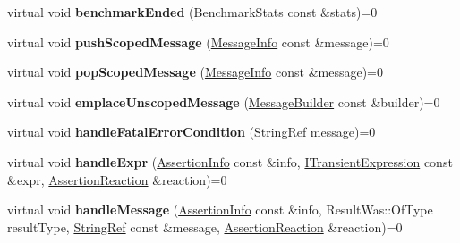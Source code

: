 \begin{DoxyCompactItemize}
virtual void {\bfseries benchmark\+Ended} (Benchmark\+Stats const \&stats)=0
\item 
\mbox{\label{structCatch_1_1IResultCapture_a91d154c1e087e383dcde5aad95cb6a05}} 
virtual void {\bfseries push\+Scoped\+Message} (\mbox{\hyperlink{structCatch_1_1MessageInfo}{Message\+Info}} const \&message)=0
\item 
\mbox{\label{structCatch_1_1IResultCapture_a42bcb13276706bf8c3ce081ce16d37fd}} 
virtual void {\bfseries pop\+Scoped\+Message} (\mbox{\hyperlink{structCatch_1_1MessageInfo}{Message\+Info}} const \&message)=0
\item 
\mbox{\label{structCatch_1_1IResultCapture_a49f74f1323ef8be71b8f9b8e8b2c0fc2}} 
virtual void {\bfseries emplace\+Unscoped\+Message} (\mbox{\hyperlink{structCatch_1_1MessageBuilder}{Message\+Builder}} const \&builder)=0
\item 
\mbox{\label{structCatch_1_1IResultCapture_a48559e6598ba9474b903697b69c769b2}} 
virtual void {\bfseries handle\+Fatal\+Error\+Condition} (\mbox{\hyperlink{classCatch_1_1StringRef}{String\+Ref}} message)=0
\item 
\mbox{\label{structCatch_1_1IResultCapture_a59a2b05391e464954575d2afb6d5d607}} 
virtual void {\bfseries handle\+Expr} (\mbox{\hyperlink{structCatch_1_1AssertionInfo}{Assertion\+Info}} const \&info, \mbox{\hyperlink{structCatch_1_1ITransientExpression}{I\+Transient\+Expression}} const \&expr, \mbox{\hyperlink{structCatch_1_1AssertionReaction}{Assertion\+Reaction}} \&reaction)=0
\item 
\mbox{\label{structCatch_1_1IResultCapture_a21788ebc64571abf322b80c8cc51794d}} 
virtual void {\bfseries handle\+Message} (\mbox{\hyperlink{structCatch_1_1AssertionInfo}{Assertion\+Info}} const \&info, Result\+Was\+::\+Of\+Type result\+Type, \mbox{\hyperlink{classCatch_1_1StringRef}{String\+Ref}} const \&message, \mbox{\hyperlink{structCatch_1_1AssertionReaction}{Assertion\+Reaction}} \&reaction)=0
\item 
\mbox{\label{structCatch_1_1IResultCapture_a6382ed20486e2d9a020da971c6d5c53d}} 

\end{DoxyCompactItemize}
